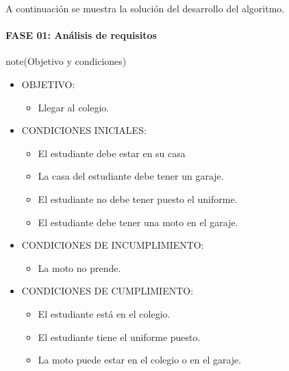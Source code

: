 \documentclass[letterpaper,10pt,spanish]{sphinxmanual}
\begin{document}
\sphinxAtStartPar
A continuación se muestra la solución del desarrollo del algoritmo.


\paragraph{FASE 01: Análisis de requisitos}
\label{\detokenize{1_guias/10programacion/G1023:fase-01-analisis-de-requisitos}}
\begin{sphinxadmonition}{note}{(Objetivo y condiciones)}
\begin{itemize}
\item {} 
\sphinxAtStartPar
OBJETIVO:
\begin{itemize}
\item {} 
\sphinxAtStartPar
Llegar al colegio.

\end{itemize}

\item {} 
\sphinxAtStartPar
CONDICIONES INICIALES:
\begin{itemize}
\item {} 
\sphinxAtStartPar
El estudiante debe estar en su casa

\item {} 
\sphinxAtStartPar
La casa del estudiante debe tener un garaje.

\item {} 
\sphinxAtStartPar
El estudiante no debe tener puesto el uniforme.

\item {} 
\sphinxAtStartPar
El estudiante debe tener una moto en el garaje.

\end{itemize}

\item {} 
\sphinxAtStartPar
CONDICIONES DE INCUMPLIMIENTO:
\begin{itemize}
\item {} 
\sphinxAtStartPar
La moto no prende.

\end{itemize}

\item {} 
\sphinxAtStartPar
CONDICIONES DE CUMPLIMIENTO:
\begin{itemize}
\item {} 
\sphinxAtStartPar
El estudiante está en el colegio.

\item {} 
\sphinxAtStartPar
El estudiante tiene el uniforme puesto.

\item {} 
\sphinxAtStartPar
La moto puede estar en el colegio o en el garaje.

\end{itemize}

\end{itemize}
\end{sphinxadmonition}
\end{document}
